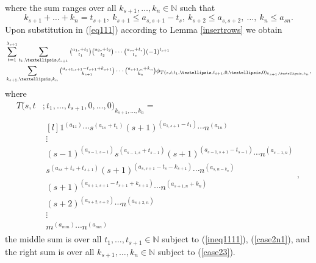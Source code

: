 \documentclass[11pt]{article}
\theoremstyle{definition}
\numberwithin{equation}{section}
\numberwithin{equation}{section}
\begin{document}
	where the sum ranges over all
	$k_{s+1},\dots,k_n \in \mathbb{N}$ such that \begin{equation}\label{case23}k_{s+1}+\dots+k_n=t_{s+1}, \  k_{s+1} \le a_{s,s+1}-t_s, \  k_{s+2} \le a_{s,s+2}, \  \dots, \  k_n \le a_{sn}.\end{equation}
	Upon substitution in (\ref{eq111}) according to Lemma \ref{insertrows} we obtain
	\begin{align*}
		&\sum_{t=1}^{\lambda_{s+1}}\sum_{t_1,\dots,t_{s+1}}\tbinom{a_{1s}+t_1}{t_1}\tbinom{a_{2s}+t_2}{t_2} \cdots \tbinom{a_{ss}+t_s}{t_s}(-1)^{t_{s+1}}\\& \sum_{k_{s+1},\dots,k_n}\tbinom{a_{s+1,s+1}-t_{s+1}+k_{s+1}}{k_{s+1}}\cdots\tbinom{a_{s+1,n}+k_n}{k_n}\phi_{T(s,t;t_1,\dots,t_{s+1},0,\dots,0)_{k_{s+1},\dots,k_n}},
	\end{align*} 
	where  \begin{align}\label{eq1110}T(s,t&;t_1,\dots,t_{s+1},0,\dots,0)_{k_{s+1},\dots,k_n}= \\\nonumber&\begin{matrix*}[l]
			1^{(a_{11})} \cdots s^{(a_{1s}+t_{1})}(s+1)^{(a_{1,s+1}-t_1)} \cdots n^{(a_{1n})} \\
			\vdots \\ 
			(s-1)^{(a_{s-1,s-1})}s^{(a_{s-1,s}+t_{s-1})}(s+1)^{(a_{s-1,s+1}-t_{s-1})} \cdots n^{(a_{s-1,n})} \\
			s^{(a_{ss}+t_s+t_{s+1})}(s+1)^{(a_{s,s+1}-t_s-k_{s+1})} \cdots n^{(a_{s,n-k_n})} \\
		(s+1)^{(a_{s+1,s+1}-t_{s+1}+k_{s+1})} \cdots n^{(a_{s+1,n}+k_n)}\\
			(s+2)^{(a_{s+2,s+2})}\cdots n^{(a_{s+2,n})} \\
			\vdots\\
			m^{(a_{mm})} \cdots n^{(a_{mn})}  \end{matrix*},\end{align} the middle sum is over all  $t_1,\dots,t_{s+1} \in \mathbb{N}$ subject to (\ref{ineq1111}), (\ref{case2n1}), and the right sum is over all  $k_{s+1},\dots,k_{n} \in \mathbb{N}$ subject to (\ref{case23}). 
	
\end{document}
